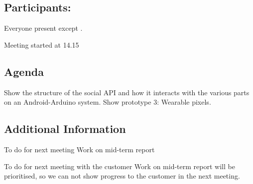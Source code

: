 \subsection{Participants:}
Everyone present except \bjornar.

Meeting started at 14.15


\subsection{Agenda}
Show the structure of the social API and how it interacts with the various parts on an Android-Arduino system.
Show prototype 3: Wearable pixels.




\subsection{Additional Information}

To do for next meeting
Work on mid-term report


To do for next meeting with the customer
Work on mid-term report will be prioritised, so we can not show progress to the customer in the next meeting.